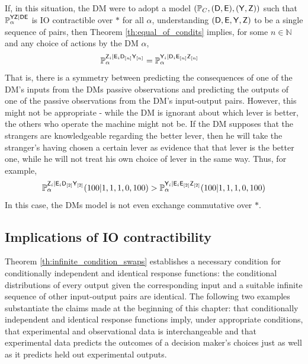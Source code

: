 If, in this situation, the DM were to adopt a model $(\mathbb{P}_C,(\mathsf{D},\mathsf{E}),(\mathsf{Y},\mathsf{Z}))$ such that $\mathbb{P}_\alpha^{\mathsf{YZ}|\mathsf{DE}}$ is IO contractible over $*$ for all $\alpha$, understanding $(\mathsf{D},\mathsf{E},\mathsf{Y},\mathsf{Z})$ to be a single sequence of pairs, then Theorem \ref{th:equal_of_condits} implies, for some $n\in\mathbb{N}$ and any choice of actions by the DM $\alpha$,
\begin{align}
    \mathbb{P}_\alpha^{\mathsf{Z}_i|\mathsf{E}_i\mathsf{D}_{[n]}\mathsf{Y}_{[n]}} &= \mathbb{P}_\alpha^{\mathsf{Y}_i|\mathsf{D}_i\mathsf{E}_{[n]}\mathsf{Z}_{[n]}}
\end{align}
That is, there is a symmetry between predicting the consequences of one of the DM's inputs from the DMs passive observations and predicting the outputs of one of the passive observations from the DM's input-output pairs. However, this might not be appropriate - while the DM is ignorant about which lever is better, the others who operate the machine might not be. If the DM supposes that the strangers are knowledgeable regarding the better lever, then he will take the stranger's having chosen a certain lever as evidence that that lever is the better one, while he will not treat his own choice of lever in the same way. Thus, for example,
\begin{align}
    \mathbb{P}_\alpha^{\mathsf{Z}_i|\mathsf{E}_i\mathsf{D}_{[2]}\mathsf{Y}_{[2]}}(100|1,1,1,0,100) > \mathbb{P}_\alpha^{\mathsf{Y}_i|\mathsf{E}_i\mathsf{E}_{[2]}\mathsf{Z}_{[2]}}(100|1,1,1,0,100)
\end{align}
In this case, the DMs model is not even exchange commutative over $*$.

\subsection{Implications of IO contractibility}

Theorem \ref{th:infinite_condition_swaps} establishes a necessary condition for conditionally independent and identical response functions: the conditional distributions of every output given the corresponding input and a suitable infinite sequence of other input-output pairs are identical. The following two examples substantiate the claims made at the beginning of this chapter: that conditionally independent and identical response functions imply, under appropriate conditions, that experimental and observational data is interchangeable and that experimental data predicts the outcomes of a decision maker's choices just as well as it predicts held out experimental outputs.

